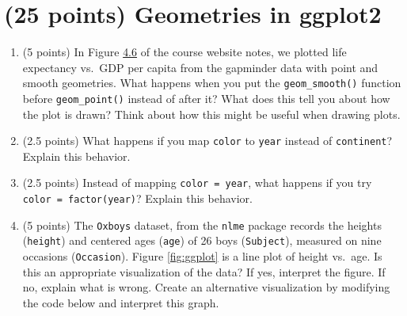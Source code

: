 \documentclass[letterpaper,12pt,twoside,]{pinp}
\begin{document}
\newpage

\hypertarget{points-geometries-in-ggplot2}{%
\section{(25 points) Geometries in
ggplot2}\label{points-geometries-in-ggplot2}}

\begin{enumerate}
\def\labelenumi{\alph{enumi})}
\item
  (5 points) In Figure
  \href{https://sahirbhatnagar.com/EPIB607/ggplot2-package-for-plots.html\#fig:03-make-a-plot-8}{4.6}
  of the course website notes, we plotted life expectancy vs.~GDP per
  capita from the gapminder data with point and smooth geometries. What
  happens when you put the \texttt{geom\_smooth()} function before
  \texttt{geom\_point()} instead of after it? What does this tell you
  about how the plot is drawn? Think about how this might be useful when
  drawing plots.
\item
  (2.5 points) What happens if you map \texttt{color} to \texttt{year}
  instead of \texttt{continent}? Explain this behavior.
\item
  (2.5 points) Instead of mapping \texttt{color\ =\ year}, what happens
  if you try \texttt{color\ =\ factor(year)}? Explain this behavior.
\item
  (5 points) The \texttt{Oxboys} dataset, from the \texttt{nlme} package
  records the heights (\texttt{height}) and centered ages (\texttt{age})
  of 26 boys (\texttt{Subject}), measured on nine occasions
  (\texttt{Occasion}). Figure \ref{fig:ggplot} is a line plot of height
  vs.~age. Is this an appropriate visualization of the data? If yes,
  interpret the figure. If no, explain what is wrong. Create an
  alternative visualization by modifying the code below and interpret
  this graph.
\end{enumerate}

\begin{Shaded}
\begin{Highlighting}[]
 \NormalTok{)}
\OtherTok{\textless{}{-}} \NormalTok{(}\NormalTok{(}
\SpecialCharTok{+} \NormalTok{()}
\end{Highlighting}
\end{Shaded}
\end{document}
